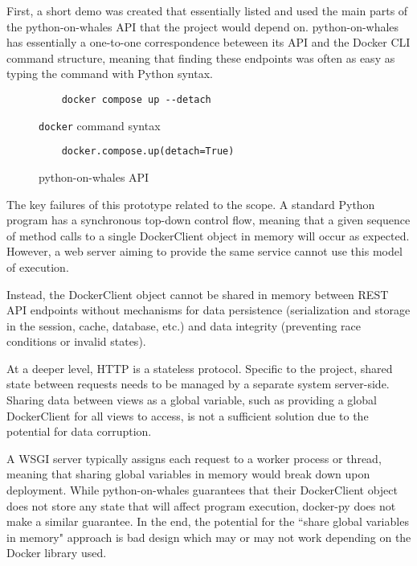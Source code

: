 \documentclass[../design-document.tex]{subfiles}
\begin{document}
First, a short demo was created that essentially listed and used the main parts of the python-on-whales API that the project would depend on. python-on-whales has essentially a one-to-one correspondence beteween its API and the Docker CLI command structure, meaning that finding these endpoints was often as easy as typing the command with Python syntax.

\begin{figure}[H]
	\centering
	\begin{verbatim}
	docker compose up --detach
	\end{verbatim}
	\caption{\texttt{docker} command syntax}
	\label{fig:docker-compose-up-cli}
\end{figure}

\begin{figure}[H]
	\centering
	\begin{verbatim}
	docker.compose.up(detach=True)
	\end{verbatim}
	\caption{python-on-whales API}
	\label{fig:docker-compose-up-python}
\end{figure}

The key failures of this prototype related to the scope. A standard Python program has a synchronous top-down control flow, meaning that a given sequence of method calls to a single DockerClient object in memory will occur as expected. However, a web server aiming to provide the same service cannot use this model of execution.

Instead, the DockerClient object cannot be shared in memory between REST API endpoints without mechanisms for data persistence (serialization and storage in the session, cache, database, etc.) and data integrity (preventing race conditions or invalid states).

At a deeper level, HTTP is a stateless protocol. Specific to the project, shared state between requests needs to be managed by a separate system server-side. Sharing data between views as a global variable, such as providing a global DockerClient for all views to access, is not a sufficient solution due to the potential for data corruption.

A WSGI server typically assigns each request to a worker process or thread, meaning that sharing global variables in memory would break down upon deployment. While python-on-whales guarantees that their DockerClient object does not store any state that will affect program execution, docker-py does not make a similar guarantee. In the end, the potential for the ``share global variables in memory" approach is bad design which may or may not work depending on the Docker library used.
\end{document}
